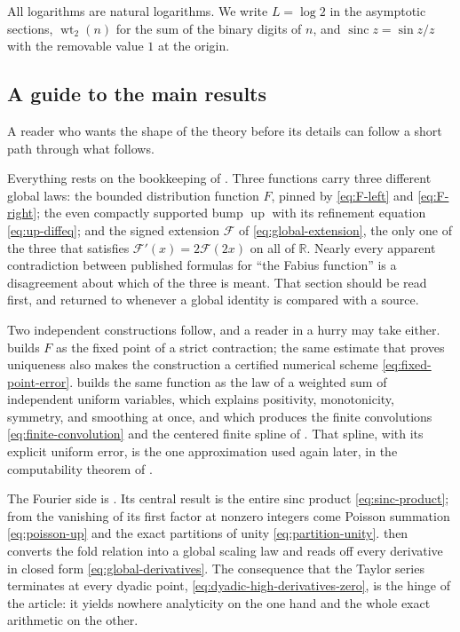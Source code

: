 \documentclass[11pt,oneside]{article}
\theoremstyle{definition}
\theoremstyle{remark}
\newcommand{\R}{\mathbb R}
\newcommand{\Up}{\operatorname{up}}
\newcommand{\sinc}{\operatorname{sinc}}
\newcommand{\wt}{\operatorname{wt}_2}
\begin{document}
All logarithms are natural logarithms.  We write $L=\log2$ in the asymptotic sections,
$\wt(n)$ for the sum of the binary digits of $n$, and
$\sinc z=\sin z/z$ with the removable value $1$ at the origin.



\subsection{A guide to the main results}
\label{sec:aud-roadmap}

A reader who wants the shape of the theory before its details can follow a short path
through what follows.

Everything rests on the bookkeeping of .  Three functions carry
three different global laws: the bounded distribution function $F$, pinned by
\eqref{eq:F-left} and \eqref{eq:F-right}; the even compactly supported bump $\Up$ with its
refinement equation \eqref{eq:up-diffeq}; and the signed extension $\mathcal F$ of
\eqref{eq:global-extension}, the only one of the three that satisfies
$\mathcal F'(x)=2\mathcal F(2x)$ on all of $\R$.  Nearly every apparent contradiction between
published formulas for ``the Fabius function'' is a disagreement about which of the three is
meant.  That section should be read first, and returned to whenever a global identity is
compared with a source.

Two independent constructions follow, and a reader in a hurry may take either.
 builds $F$ as the fixed point of a strict contraction; the same estimate
that proves uniqueness also makes the construction a certified numerical scheme
\eqref{eq:fixed-point-error}.   builds the same function as the law of
a weighted sum of independent uniform variables, which explains positivity, monotonicity,
symmetry, and smoothing at once, and which produces the finite convolutions
\eqref{eq:finite-convolution} and the centered finite spline of .
That spline, with its explicit uniform error, is the one approximation used again later, in
the computability theorem of .

The Fourier side is .  Its central result is the entire sinc product
\eqref{eq:sinc-product}; from the vanishing of its first factor at nonzero integers come
Poisson summation \eqref{eq:poisson-up} and the exact partitions of unity
\eqref{eq:partition-unity}.   then converts the fold relation into a global
scaling law and reads off every derivative in closed form \eqref{eq:global-derivatives}.  The
consequence that the Taylor series terminates at every dyadic point,
\eqref{eq:dyadic-high-derivatives-zero}, is the hinge of the article: it yields nowhere
analyticity on the one hand and the whole exact arithmetic on the other.
\end{document}
